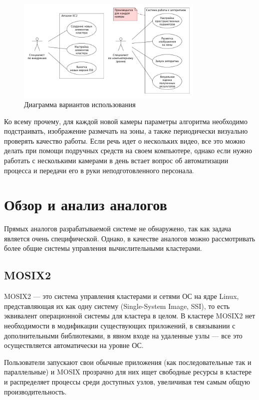 \begin{figure}
  \centering
  \includegraphics[width=0.8\textwidth]{assets/use-case-1.png}
  \caption{Диаграмма вариантов использования}
  \label{fig:fig01}
\end{figure}

Ко всему прочему, для каждой новой камеры параметры алгоритма необходимо подстраивать, изображение размечать на зоны, а также периодически визуально проверять качество работы. Если речь идет о нескольких видео, все это можно делать при помощи подручных средств на своем компьютере, однако если нужно работать с несколькими камерами в день встает вопрос об автоматизации процесса и передачи его в руки неподготовленного персонала.

\section{Обзор и анализ аналогов}

Прямых аналогов разрабатываемой системе не обнаружено, так как задача является очень специфической. Однако, в качестве аналогов можно рассмотривать более общие системы управления вычислительными кластерами.

\subsection{MOSIX2}
MOSIX2 — это система управления кластерами и сетями ОС на ядре Linux, представляющая их как одну систему (Single-System Image, SSI), то есть эквивалент операционной системы для кластера в целом. В кластере MOSIX2 нет необходимости в модификации существующих приложений, в связывании с дополнительными библиотеками, в явном входе на удаленные узлы — все это осуществляется автоматически на уровне ОС.

Пользователи запускают свои обычные приложения (как последовательные так и параллельные) и MOSIX прозрачно для них ищет свободные ресурсы в кластере и распределяет процессы среди доступных узлов, увеличивая тем самым общую производительность.

